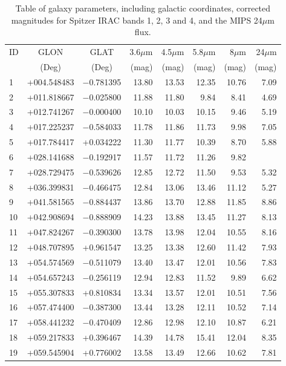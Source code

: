\documentclass[times,usenatbib]{mn2e}
\begin{document}
\begin{table}
\begin{center}
\caption{Table of galaxy parameters, including galactic coordinates, corrected magnitudes for Spitzer IRAC bands 1, 2, 3 and 4, and the MIPS 24$\mu$m flux.}
\begin{tabular}{lccrrrrr}
\hline
ID & GLON & GLAT & 3.6$\mu$m & 4.5$\mu$m & 5.8$\mu$m & 8$\mu$m & 24$\mu$m \\
 & (Deg) & (Deg) & (mag) & (mag) & (mag) & (mag) & (mag) \\
\hline
 1 & +004.548483 & $-$0.781395 & 13.80 & 13.53 & 12.35 & 10.76 & 7.09 \\
 2 & +011.818667 & $-$0.025800 & 11.88 & 11.80 & 9.84 & 8.41 & 4.69 \\
 3 & +012.741267 & $-$0.000400 & 10.10 & 10.03 & 10.15 & 9.46 & 5.19 \\
 4 & +017.225237 & $-$0.584033 & 11.78 & 11.86 & 11.73 & 9.98 & 7.05 \\
 5 & +017.784417 & +0.034222 & 11.30 & 11.77 & 10.39 & 8.70 & 5.88 \\
 6 & +028.141688 & $-$0.192917 & 11.57 & 11.72 & 11.26 & 9.82 &  \\
 7 & +028.729475 & $-$0.539626 & 12.85 & 12.72 & 11.50 & 9.53 & 5.32 \\
 8 & +036.399831 & $-$0.466475 & 12.84 & 13.06 & 13.46 & 11.12 & 5.27 \\
 9 & +041.581565 & $-$0.884437 & 13.86 & 13.70 & 12.88 & 11.85 & 8.86 \\
10 & +042.908694 & $-$0.888909 & 14.23 & 13.88 & 13.45 & 11.27 & 8.13 \\
11 & +047.824267 & $-$0.390300 & 13.78 & 13.98 & 12.04 & 10.55 & 8.16 \\
12 & +048.707895 & +0.961547 & 13.25 & 13.38 & 12.60 & 11.42 & 7.93 \\
13 & +054.574569 & $-$0.511079 & 13.40 & 13.47 & 12.01 & 10.56 & 7.83 \\
14 & +054.657243 & $-$0.256119 & 12.94 & 12.83 & 11.52 & 9.89 & 6.62 \\
15 & +055.307833 & +0.810834 & 13.34 & 13.57 & 12.01 & 10.51 & 7.56 \\
16 & +057.474400 & $-$0.387300 & 13.44 & 13.28 & 12.11 & 10.52 & 7.14 \\
17 & +058.441232 & $-$0.470409 & 12.86 & 12.98 & 12.10 & 10.87 & 6.21 \\
18 & +059.217833 & +0.396467 & 14.39 & 14.78 & 15.41 & 12.04 & 8.35 \\
19 & +059.545904 & +0.776002 & 13.58 & 13.49 & 12.66 & 10.62 & 7.81 \\

\end{tabular}
\end{center}
\end{table}
\end{document}

